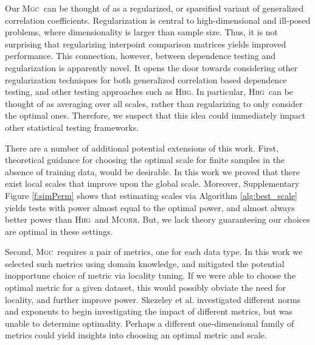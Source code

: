 \documentclass[11pt]{article}
\newcommand{\note}[2][]{\added[#1,remark={#2}]{}}
\providecommand{\sct}[1]{{\normalfont\textsc{#1}}}
\newcommand{\Mgc}{\sct{Mgc}}
\newcommand{\Hhg}{\sct{Hhg}}
\newcommand{\Mcorr}{\sct{Mcorr}}
\newcommand{\jv}[1]{{\note{jv: #1}}}
\begin{document}
Our \Mgc~can be thought of as a regularized, or sparsified variant of generalized correlation coefficients.  Regularization is central to high-dimensional and ill-posed problems, where dimensionality is larger than sample size.  Thus, it is not surprising that regularizing interpoint comparison matrices yields improved performance.  This connection, however, between dependence testing and regularization is apparently novel.  It opens the door towards considering other regularization techniques for both generalized correlation based dependence testing, and other testing approaches such as \Hhg. In particular, \Hhg~can be thought of as averaging over all scales, rather than regularizing to only consider the optimal ones.  Therefore, we suspect that this idea could immediately impact other statistical testing frameworks.



There are a number of additional potential extensions of this work.  First, theoretical guidance for choosing the optimal scale for finite samples  in the absence of training data, would be desirable. 
In this work we proved that there exist local scales that improve upon the global scale. Moreover, Supplementary Figure \ref{f:simPerm} shows that estimating scales via Algorithm \ref{alg:best_scale} yields tests with power almost equal to the optimal power, and almost always better power than \Hhg~and \Mcorr.  But, we lack theory guaranteeing our choices are optimal in these settings.


Second, \Mgc~requires a pair of metrics, one for each data type. In this work we selected such metrics using domain knowledge, and mitigated the potential inopportune choice of metric via locality tuning.  If we were able to choose the optimal metric for a given dataset, this would possibly obviate the need for locality, and further improve power. Skezeley et al. investigated different norms and exponents to begin investigating the impact of different metrics, but was unable to determine optimality.
Perhaps a different one-dimensional family of metrics could yield insights into choosing an optimal metric and scale.
\end{document}
